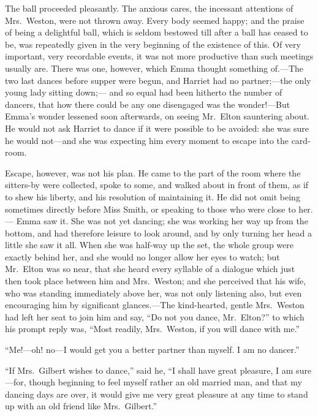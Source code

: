 The ball proceeded pleasantly.  The anxious cares, the incessant
attentions of Mrs.\ Weston, were not thrown away.  Every body
seemed happy; and the praise of being a delightful ball,
which is seldom bestowed till after a ball has ceased to be,
was repeatedly given in the very beginning of the existence of this.
Of very important, very recordable events, it was not more productive
than such meetings usually are.  There was one, however, which Emma
thought something of.---The two last dances before supper were begun,
and Harriet had no partner;---the only young lady sitting down;---%
and so equal had been hitherto the number of dancers, that how there
could be any one disengaged was the wonder!---But Emma's wonder
lessened soon afterwards, on seeing Mr.\ Elton sauntering about.
He would not ask Harriet to dance if it were possible to be avoided:
she was sure he would not---and she was expecting him every moment to
escape into the card-room.

Escape, however, was not his plan.  He came to the part of the room
where the sitters-by were collected, spoke to some, and walked about
in front of them, as if to shew his liberty, and his resolution
of maintaining it.  He did not omit being sometimes directly
before Miss Smith, or speaking to those who were close to her.---%
Emma saw it.  She was not yet dancing; she was working her way
up from the bottom, and had therefore leisure to look around,
and by only turning her head a little she saw it all.  When she was
half-way up the set, the whole group were exactly behind her, and she
would no longer allow her eyes to watch; but Mr.\ Elton was so near,
that she heard every syllable of a dialogue which just then took
place between him and Mrs.\ Weston; and she perceived that his wife,
who was standing immediately above her, was not only listening also,
but even encouraging him by significant glances.---The kind-hearted,
gentle Mrs.\ Weston had left her seat to join him and say, ``Do not
you dance, Mr.\ Elton?'' to which his prompt reply was, ``Most readily,
Mrs.\ Weston, if you will dance with me.''

``Me!---oh! no---I would get you a better partner than myself.
I am no dancer.''

``If Mrs.\ Gilbert wishes to dance,'' said he, ``I shall have great pleasure,
I am sure---for, though beginning to feel myself rather an old married man,
and that my dancing days are over, it would give me very great
pleasure at any time to stand up with an old friend like Mrs.\ Gilbert.''

